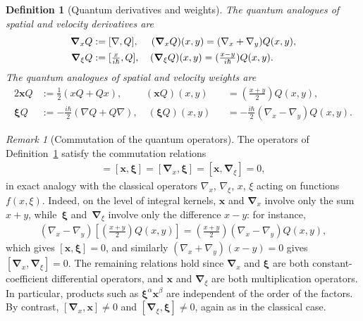 \documentclass[JEP,XML,SOM,Unicode]{cedram}
\theoremstyle{plain}
\newtheorem{definition}[theorem]{Definition}
\theoremstyle{remark}
\newtheorem{remark}[theorem]{Remark}
\newcommand{\br}[1]{\left(#1\right)}
\newcommand{\sbr}[1]{\left[#1\right]}
\newcommand{\mytextfrac}[2]{{\textstyle\frac{#1}{#2}}}
\begin{document}
\begin{definition}[Quantum derivatives and weights]\label{toolboxdefinition}
The quantum analogues of spatial and velocity derivatives are
\begin{align*}
\bm{\nabla}_xQ&:=[\nabla,Q],\quad\hspace{0.045cm}\, (\bm{\nabla}_xQ)(x,y)=(\nabla_x+\nabla_y)Q(x,y),\\
\bm{\nabla}_\xi Q&:=[\mytextfrac{x}{i\hbar},Q],\quad \hspace{0.015cm}(\bm{\nabla}_\xi Q)(x,y)=(\mytextfrac{x-y}{i\hbar})Q(x,y).
\end{align*}
The quantum analogues of spatial and velocity weights are
\begin{alignat*}{2}
\bm{x}Q
&:=\mytextfrac{1}{2}(xQ+Qx),\quad\quad\,\,
(\bm{x}Q)(x,y)&&=(\mytextfrac{x+y}{2})Q(x,y),\\
\bm{\xi}Q&:=-\mytextfrac{i\hbar}{2}(\nabla Q+Q\nabla),\quad
(\bm{\xi}Q)(x,y)
&&=-\mytextfrac{i\hbar}{2}(\nabla_x-\nabla_y)Q(x,y).
\end{alignat*}
\end{definition}
\begin{remark}[Commutation of the quantum operators]\label{commutationremark}
The operators of Definition~\ref{toolboxdefinition} satisfy the commutation relations
\begin{align*}
[\bm{\nabla}_x,\bm{\nabla}_\xi]=[\bm{x},\bm{\xi}]=[\bm{\nabla}_x,\bm{\xi}]=[\bm{x},\bm{\nabla}_\xi]=0,
\end{align*}
in exact analogy with the classical operators $\nabla_x$, $\nabla_\xi$, $x$, $\xi$ acting on functions $f(x,\xi)$. Indeed, on the level of integral kernels, $\bm{x}$ and $\bm{\nabla}_x$ involve only the sum $x+y$, while~$\bm{\xi}$ and~$\bm{\nabla}_\xi$ involve only the difference $x-y$: for instance,
\begin{align*}
(\nabla_x-\nabla_y)\sbr{\br{\mytextfrac{x+y}{2}}Q(x,y)}=\br{\mytextfrac{x+y}{2}}(\nabla_x-\nabla_y)Q(x,y),
\end{align*}
which gives $[\bm{x},\bm{\xi}]=0$, and similarly $(\nabla_x+\nabla_y)(x-y)=0$ gives $[\bm{\nabla}_x,\bm{\nabla}_\xi]=0$. The remaining relations hold since $\bm{\nabla}_x$ and $\bm{\xi}$ are both constant-coefficient differential operators, and $\bm{x}$ and $\bm{\nabla}_\xi$ are both multiplication operators. In particular, products such as $\bm{\xi}^{\alpha}\bm{x}^{\beta}$ are independent of the order of the factors. By contrast, $[\bm{\nabla}_x,\bm{x}]\neq0$ and $[\bm{\nabla}_\xi,\bm{\xi}]\neq0$, again as in the classical case.
\end{remark}
\end{document}
